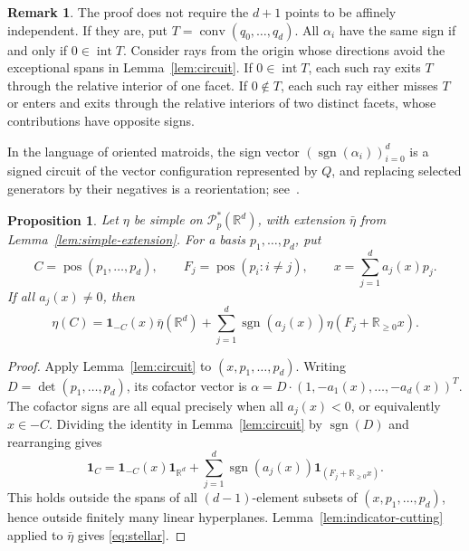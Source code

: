 \documentclass[11pt]{article}
\newcommand{\R}{\mathbb{R}}
\newcommand{\PP}{\mathcal{P}}
\newcommand{\pos}{\operatorname{pos}}
\newcommand{\sgn}{\operatorname{sgn}}
\newcommand{\inter}{\operatorname{int}}
\theoremstyle{plain}
\newtheorem{proposition}[theorem]{Proposition}
\theoremstyle{definition}
\newtheorem{remark}[theorem]{Remark}
\begin{document}
\begin{remark}\label{rem:circuit-coverage}
The proof does not require the $d+1$ points to be affinely independent.
If they are, put $T=\operatorname{conv}(q_0,\ldots,q_d)$.
All $\alpha_i$ have the same sign if and only if $0\in\inter T$.
Consider rays from the origin whose directions avoid the exceptional
spans in Lemma~\ref{lem:circuit}.  If $0\in\inter T$, each such ray
exits $T$ through the relative interior of one facet.  If $0\notin T$,
each such ray either misses $T$ or enters and exits through the relative
interiors of two distinct facets, whose contributions have opposite signs.

In the language of oriented matroids, the sign
vector $(\sgn(\alpha_i))_{i=0}^d$ is a signed circuit of the vector
configuration represented by $Q$, and replacing selected generators
by their negatives is a reorientation; see~\cite[Section~1.2]{BLSWZ99:Oriented-Matroids}.
\end{remark}

\begin{proposition}\label{prop:stellar}
Let $\eta$ be simple on $\PP_p^*(\R^d)$, with extension $\bar\eta$ from
Lemma~\ref{lem:simple-extension}.  For a basis $p_1,\ldots,p_d$, put
\[
  C=\pos(p_1,\ldots,p_d),\qquad F_j=\pos(p_i:i\ne j),\qquad
  x=\sum_{j=1}^d a_j(x)p_j.
\]
If all $a_j(x)\ne0$, then
\begin{equation}\label{eq:stellar}
  \eta(C)=\mathbf1_{-C}(x)\bar\eta(\R^d)
       +\sum_{j=1}^d\sgn(a_j(x))\eta(F_j+\R_{\ge0}x).
\end{equation}
\end{proposition}

\begin{proof}
Apply Lemma~\ref{lem:circuit} to $(x,p_1,\ldots,p_d)$.
Writing $D=\det(p_1,\ldots,p_d)$, its cofactor vector is
$\alpha=D\cdot (1,-a_1(x),\ldots,-a_d(x))^T$.
The cofactor signs are all equal precisely when all $a_j(x)<0$,
or equivalently $x\in -C$.  Dividing the identity in
Lemma~\ref{lem:circuit} by $\sgn(D)$ and rearranging gives
\begin{equation*}
 \mathbf1_{C} = \mathbf1_{-C}(x)\mathbf1_{\R^d}+\sum_{j=1}^d\sgn(a_j(x))\mathbf1_{(F_j+\R_{\ge0}x)}.
\end{equation*}
This holds outside the spans of all $(d-1)$-element subsets of
$(x,p_1,\ldots,p_d)$, hence outside finitely many linear hyperplanes.
Lemma~\ref{lem:indicator-cutting} applied to $\bar\eta$
gives \eqref{eq:stellar}.
\end{proof}
\end{document}
